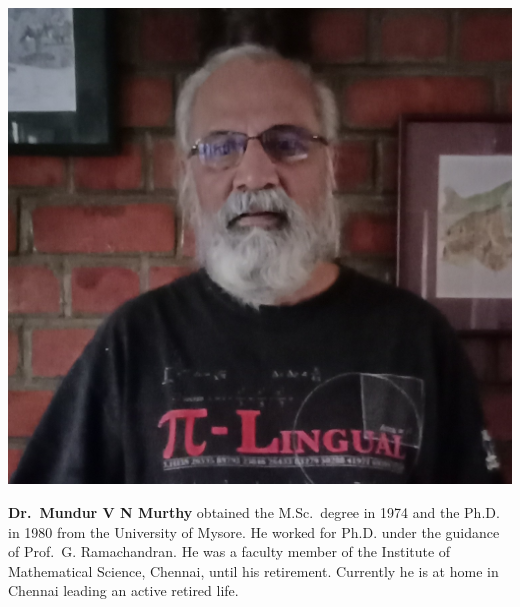 \centerline{\includegraphics[scale=.1]{authorsphotos/Prof_M_V_N_Murthy.jpg}}
\bigskip 

\noindent
\textbf{Dr.\ Mundur V N Murthy} obtained the M.Sc.\ degree in 1974 and the Ph.D. in 1980 from the University of Mysore. He worked for Ph.D. under the guidance of Prof.\ G. Ramachandran. He was a faculty member of the Institute of Mathematical Science, Chennai, until his retirement. Currently he is at home in Chennai leading an active retired life.

